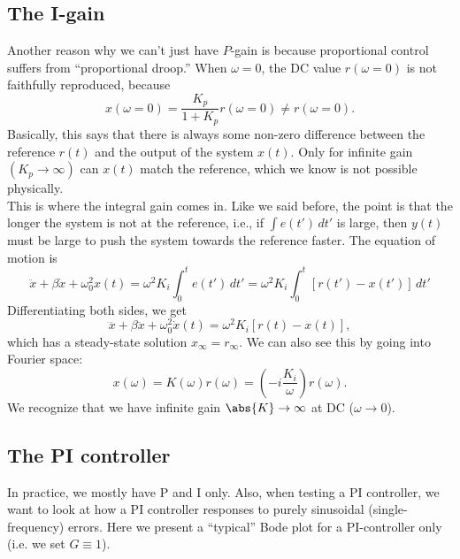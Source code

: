 \documentclass{article}
\theoremstyle{definition}
\newcommand{\f}[2]{\frac{#1}{#2}}
\newcommand{\lp}{\left(}
\newcommand{\rp}{\right)}
\begin{document}
\subsection{The I-gain}

Another reason why we can't just have $P$-gain is because proportional control suffers from ``proportional droop.'' When $\omega=0$, the DC value $r(\omega=0)$ is not faithfully reproduced, because 
\begin{equation*}
x(\omega=0) = \f{K_p}{1+K_p}r(\omega=0) \neq r(\omega=0).
\end{equation*}
Basically, this says that there is always some non-zero difference between the reference $r(t)$ and the output of the system $x(t)$. Only for infinite gain $(K_p \to \infty)$ can $x(t)$ match the reference, which we know is not possible physically. \\

This is where the integral gain comes in. Like we said before, the point is that the longer the system is not at the reference, i.e., if $\int e(t')\,dt'$ is large, then $y(t)$ must be large to push the system towards the reference faster. The equation of motion is 
\begin{equation*}
\ddot{x} + \beta \dot{x} + \omega_0^2 x(t) = \omega^2 K_i  \int_0^t e(t')\,dt' = \omega^2 K_i  \int_0^t [r(t') - x(t')]\,dt'
\end{equation*}
Differentiating both sides, we get
\begin{equation*}
\dddot{x} + \beta \ddot{x} + \omega_0^2 \dot{x}(t) = \omega^2 K_i [ r(t) -x(t) ],
\end{equation*}
which has a steady-state solution $x_\infty = r_\infty$. We can also see this by going into Fourier space:
\begin{equation*}
x(\omega) = K(\omega) r(\omega) = \lp -i \f{K_i}{\omega} \rp r(\omega).
\end{equation*}
We recognize that we have infinite gain $\abs{K} \to \infty$ at DC ($\omega\to 0$). 




\subsection{The PI controller}

In practice, we mostly have P and I only. Also, when testing a PI controller, we want to look at how a PI controller responses to purely sinusoidal (single-frequency) errors. Here we present a ``typical'' Bode plot for a PI-controller only (i.e. we set $G\equiv 1$). 
\end{document}

